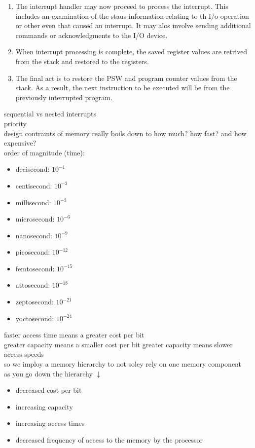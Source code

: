 \documentclass{article}
\begin{document}
\begin{enumerate}
		\item The interrupt handler may now proceed to process the interrupt. This includes an examination of the staus information relating to th I/o operation or other even that caused an interrupt. It may alos involve sending additional commands or acknowledgments to the I/O device.
		
		\item When interrupt processing is complete, the saved register values are retrived from the stack and restored to the registers.
		
		\item The final act is to restore the PSW and program counter values from the stack. As a result, the next instruction to be executed will be from the previously interrupted program.
	\end{enumerate}

sequential vs nested interrupts\\
priority\\

design contraints of memory really boils down to how much? how fast? and how expensive?\\

order of magnitude (time):
	\begin{itemize}
		\item decisecond: $10^{-1}$
		\item centisecond: $10^{-2}$
		\item millisecond: $10^{-3}$
		\item microsecond: $10^{-6}$
		\item nanosecond: $10^{-9}$
		\item picosecond: $10^{-12}$
		\item femtosecond: $10^{-15}$
		\item attosecond: $10^{-18}$
		\item zeptosecond: $10^{-21}$
		\item yoctosecond: $10^{-24}$
	\end{itemize} 

faster access time means a greater cost per bit\\
greater capacity means a smaller cost per bit
greater capacity means slower access speeds\\

so we imploy a memory hierarchy to not soley rely on one memory component\\

as you go down the hierarchy $\downarrow$
	\begin{itemize}
		\item decreased cost per bit
		\item increasing capacity
		\item increasing access times
		\item decreased frequency of access to the memory by the processor
	\end{itemize}
\end{document}
